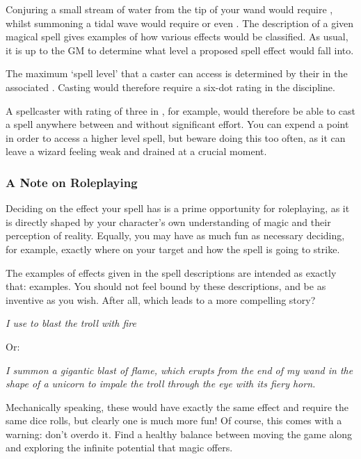 Conjuring a small stream of water from the tip of your wand would require , whilst summoning a tidal wave would require  or even . The description of a given magical spell gives examples of how various effects would be classified. As usual, it is up to the GM to determine what level a proposed spell effect would fall into.

The maximum `spell level' that a caster can access is determined by their  in the associated . Casting  would therefore require a six-dot rating in the  discipline. 

A spellcaster with  rating of three in , for example, would therefore be able to cast a  spell anywhere between \levelZero{} and \levelThree{} without significant effort. You can expend a  point in order to access a higher level spell, but beware doing this too often, as it can leave a wizard feeling weak and drained at a crucial moment. 


\subsubsection{A Note on Roleplaying}

Deciding on the effect your spell has is a prime opportunity for roleplaying, as it is directly shaped by your character's own understanding of magic and their perception of reality. Equally, you may have as much fun as necessary deciding, for example, exactly where on your target and how the spell is going to strike. 

The examples of effects given in the spell descriptions are intended as exactly that: examples. You should not feel bound by these descriptions, and be as inventive as you wish. After all, which leads to a more compelling story?

{\it I use  \levelThree{} to blast the troll with fire}

Or:

{\it I summon a gigantic blast of flame, which erupts from the end of my wand in the shape of a unicorn to impale the troll through the eye with its fiery horn.}

Mechanically speaking, these would have exactly the same effect and require the same dice rolls, but clearly one is much more fun! Of course, this comes with a warning: don't overdo it. Find a healthy balance between moving the game along and exploring the infinite potential that magic offers.

